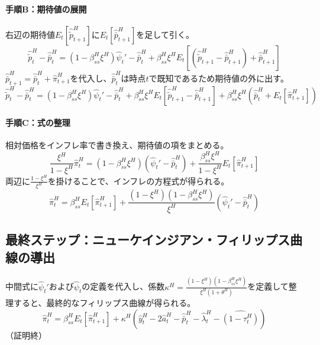 \paragraph{手順B：期待値の展開}
\label{sec:appendix_optimal_price_derivation_dynamics_sub2_b}
右辺の期待値\(E_t[\hat{\widetilde{p}}_{t+1}^H]\)に\(E_t[\hat{\bar{p}}_{t+1}^H]\)を足して引く。
\begin{equation}
\hat{\widetilde{p}}_t^H-\hat{\bar{p}}_t^H=(1-\beta_{ss}^H\xi^H)\hat{\psi}_t'-\hat{\bar{p}}_t^H+\beta_{ss}^H\xi^HE_t\left[(\hat{\widetilde{p}}_{t+1}^H-\hat{\bar{p}}_{t+1}^H)+\hat{\bar{p}}_{t+1}^H\right]
\label{eq:appendix_optimal_price_derivation_dynamics_sub2_step_b1}
\end{equation}
\(\hat{\bar{p}}_{t+1}^H=\hat{\bar{p}}_t^H+\hat{\pi}_{t+1}^H\)を代入し、\(\hat{\bar{p}}_t^H\)は時点\(t\)で既知であるため期待値の外に出す。
\begin{equation}
\hat{\widetilde{p}}_t^H-\hat{\bar{p}}_t^H=(1-\beta_{ss}^H\xi^H)\hat{\psi}_t'-\hat{\bar{p}}_t^H+\beta_{ss}^H\xi^HE_t\left[\hat{\widetilde{p}}_{t+1}^H-\hat{\bar{p}}_{t+1}^H\right]+\beta_{ss}^H\xi^H(\hat{\bar{p}}_t^H+E_t[\hat{\pi}_{t+1}^H])
\label{eq:appendix_optimal_price_derivation_dynamics_sub2_step_b2}
\end{equation}

\paragraph{手順C：式の整理}
\label{sec:appendix_optimal_price_derivation_dynamics_sub2_c}
相対価格をインフレ率で書き換え、期待値の項をまとめる。
\begin{equation}
\frac{\xi^H}{1-\xi^H}\hat{\pi}_t^H=(1-\beta_{ss}^H\xi^H)(\hat{\psi}_t'-\hat{\bar{p}}_t^H)+\frac{\beta_{ss}^H\xi^H}{1-\xi^H}E_t[\hat{\pi}_{t+1}^H]
\label{eq:appendix_optimal_price_derivation_dynamics_sub2_step_c}
\end{equation}
両辺に\(\frac{1-\xi^H}{\xi^H}\)を掛けることで、インフレの方程式が得られる。
\begin{equation}
\hat{\pi}_t^H=\beta_{ss}^HE_t[\hat{\pi}_{t+1}^H]+\frac{(1-\xi^H)(1-\beta_{ss}^H\xi^H)}{\xi^H}(\hat{\psi}_t'-\hat{\bar{p}}_t^H)
\label{eq:appendix_optimal_price_derivation_dynamics_sub2_step_c_final}
\end{equation}

\subsection*{最終ステップ：ニューケインジアン・フィリップス曲線の導出}
\label{sec:appendix_optimal_price_derivation_dynamics_final}
中間式に\(\hat{\psi}_t'\)および\(\hat{\psi}_t\)の定義を代入し、係数\(\kappa^H=\frac{(1-\xi^H)(1-\beta_{ss}^H\xi^H)}{\xi^H(1+\theta^H)}\)を定義して整理すると、最終的なフィリップス曲線が得られる。
\begin{equation}
\hat{\pi}_t^H=\beta_{ss}^HE_t[\hat{\pi}_{t+1}^H]+\kappa^H\left(\hat{y}_t^H-2\hat{a}_t^H-\hat{\bar{p}}_t^H-\hat{\lambda}_t^H-\widehat{(1-\tau_t^H)}\right)
\label{eq:appendix_optimal_price_derivation_dynamics_final_nkpc}
\end{equation}
（証明終）